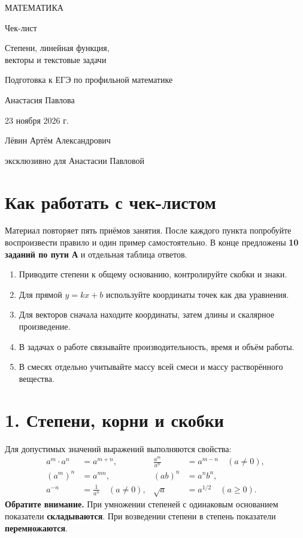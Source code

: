 \documentclass[a4paper,11pt]{article}
\newcommand{\secname}[1]{\section*{\color{darkaccent}#1}\vspace{-4pt}\color{black}}
\newcommand{\tip}[1]{\textcolor{darkaccent}{\textbf{Обратите внимание.}} #1}
\begin{document}
\thispagestyle{empty}
\begin{center}
\vspace*{23mm}
{\large\color{darkaccent} МАТЕМАТИКА}\par
\vspace{19mm}
{\LARGE Чек-лист}\par
\vspace{15mm}
{\Large\color{accent} Степени, линейная функция,\\[4pt] векторы и текстовые задачи}\par
\vspace{15mm}
{\normalsize Подготовка к ЕГЭ по профильной математике}\par
\vspace{37mm}
{\large Анастасия Павлова}\par
\vspace{14mm}
{\normalsize 23 ноября 2026 г.}\par
\vfill
{\small Лёвин Артём Александрович}\par
{\small эксклюзивно для Анастасии Павловой}\par
\vspace{15mm}
\vspace{6mm}
\end{center}
\clearpage
\secname{Как работать с чек-листом}
Материал повторяет пять приёмов занятия. После каждого пункта попробуйте воспроизвести правило и один пример самостоятельно. В конце предложены \textbf{10 заданий по пути А} и отдельная таблица ответов.
\begin{enumerate}[label=\textcolor{darkaccent}{\arabic*.}]
\item Приводите степени к общему основанию, контролируйте скобки и знаки.
\item Для прямой $y=kx+b$ используйте координаты точек как два уравнения.
\item Для векторов сначала находите координаты, затем длины и скалярное произведение.
\item В задачах о работе связывайте производительность, время и объём работы.
\item В смесях отдельно учитывайте массу всей смеси и массу растворённого вещества.
\end{enumerate}
\secname{1. Степени, корни и скобки}
Для допустимых значений выражений выполняются свойства:
\[
\begin{aligned}
 a^m\cdot a^n&=a^{m+n},&\frac{a^m}{a^n}&=a^{m-n}\quad(a\ne0),\\
 (a^m)^n&=a^{mn},&(ab)^n&=a^nb^n,\\
 a^{-n}&=\frac1{a^n}\quad(a\ne0),&\sqrt{a}&=a^{1/2}\quad(a\ge0).
\end{aligned}
\]
\tip{При умножении степеней с одинаковым основанием показатели \textbf{складываются}. При возведении степени в степень показатели \textbf{перемножаются}.}
\end{document}
